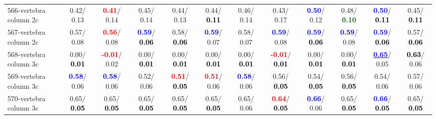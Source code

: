 \begin{table}[h]
\begin{center}
{\begin{tabular}{lc|c|c|c|c|c|c|c|c|c|c}
566-vertebra column 2c &   0.42/  0.13 & \textcolor{red}{\textbf{  0.41}}/  0.14 &   0.45/  0.14 &   0.44/  0.13 &   0.44/\textcolor{black}{\textbf{  0.11}} &   0.46/  0.14 &   0.43/  0.17 & \textcolor{blue}{\textbf{  0.50}}/  0.12 &   0.48/\textcolor{darkgreen}{\textbf{  0.10}} & \textcolor{blue}{\textbf{  0.50}}/\textcolor{black}{\textbf{  0.11}} &   0.45/\textcolor{black}{\textbf{  0.11}} \\
567-vertebra column 2c &   0.57/  0.08 & \textcolor{red}{\textbf{  0.56}}/  0.08 & \textcolor{blue}{\textbf{  0.59}}/\textcolor{black}{\textbf{  0.06}} &   0.58/\textcolor{black}{\textbf{  0.06}} & \textcolor{blue}{\textbf{  0.59}}/  0.07 &   0.58/  0.07 & \textcolor{blue}{\textbf{  0.59}}/  0.08 & \textcolor{blue}{\textbf{  0.59}}/\textcolor{black}{\textbf{  0.06}} & \textcolor{blue}{\textbf{  0.59}}/  0.08 & \textcolor{blue}{\textbf{  0.59}}/\textcolor{black}{\textbf{  0.06}} &   0.57/\textcolor{black}{\textbf{  0.06}} \\
568-vertebra column 3c &   0.00/\textcolor{black}{\textbf{  0.01}} & \textcolor{red}{\textbf{ -0.01}}/  0.02 &   0.00/\textcolor{black}{\textbf{  0.01}} &   0.00/\textcolor{black}{\textbf{  0.01}} &   0.00/\textcolor{black}{\textbf{  0.01}} &   0.00/\textcolor{black}{\textbf{  0.01}} & \textcolor{red}{\textbf{ -0.01}}/\textcolor{black}{\textbf{  0.01}} &   0.00/\textcolor{black}{\textbf{  0.01}} &   0.00/\textcolor{black}{\textbf{  0.01}} & \underline{\textcolor{blue}{\textbf{  0.65}}}/  0.05 & \textcolor{black}{\textbf{  0.63}}/  0.06 \\
569-vertebra column 3c & \textcolor{blue}{\textbf{  0.58}}/  0.06 & \textcolor{blue}{\textbf{  0.58}}/  0.06 &   0.52/  0.06 & \textcolor{red}{\textbf{  0.51}}/\textcolor{black}{\textbf{  0.05}} & \textcolor{red}{\textbf{  0.51}}/  0.06 & \textcolor{blue}{\textbf{  0.58}}/  0.06 &   0.56/\textcolor{black}{\textbf{  0.05}} &   0.54/\textcolor{black}{\textbf{  0.05}} &   0.56/\textcolor{black}{\textbf{  0.05}} &   0.54/  0.06 &   0.57/  0.06 \\
570-vertebra column 3c &   0.65/\textcolor{black}{\textbf{  0.05}} &   0.65/\textcolor{black}{\textbf{  0.05}} &   0.65/\textcolor{black}{\textbf{  0.05}} &   0.65/\textcolor{black}{\textbf{  0.05}} &   0.65/\textcolor{black}{\textbf{  0.05}} &   0.65/  0.06 & \textcolor{red}{\textbf{  0.64}}/\textcolor{black}{\textbf{  0.05}} & \textcolor{blue}{\textbf{  0.66}}/  0.06 &   0.65/\textcolor{black}{\textbf{  0.05}} & \textcolor{blue}{\textbf{  0.66}}/\textcolor{black}{\textbf{  0.05}} &   0.65/\textcolor{black}{\textbf{  0.05}} \\

\end{tabular}}
\end{center}
\end{table}
